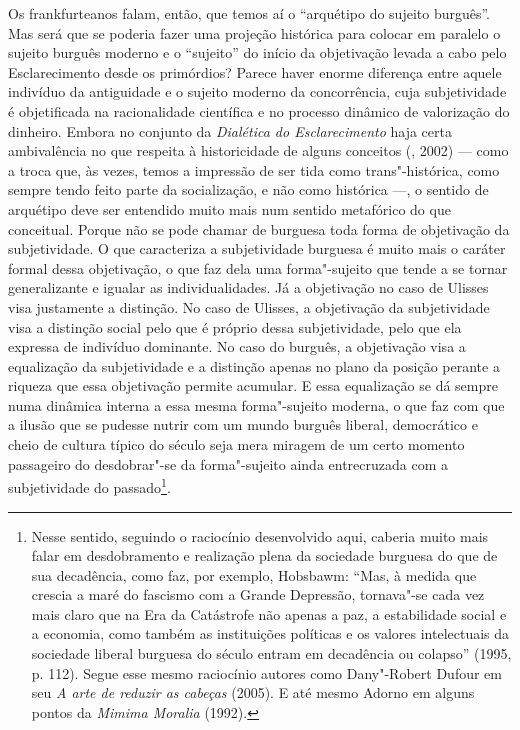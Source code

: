 Os frankfurteanos falam, então, que temos aí o ``arquétipo do sujeito
burguês''. Mas será que se poderia fazer uma projeção histórica para
colocar em paralelo o sujeito burguês moderno e o ``sujeito'' do início
da objetivação levada a cabo pelo Esclarecimento desde os primórdios?
Parece haver enorme diferença entre aquele indivíduo da antiguidade e o
sujeito moderno da concorrência, cuja subjetividade é objetificada na
racionalidade científica e no processo dinâmico de valorização do
dinheiro. Embora no conjunto da \emph{Dialética do Esclarecimento} haja
certa ambivalência no que respeita à historicidade de alguns conceitos
(, 2002) --- como a troca que, às vezes, temos a impressão de ser
tida como trans"-histórica, como sempre tendo feito parte da
socialização, e não como histórica ---, o sentido de arquétipo deve ser
entendido muito mais num sentido metafórico do que conceitual. Porque
não se pode chamar de burguesa toda forma de objetivação da
subjetividade. O que caracteriza a subjetividade burguesa é muito mais o
caráter formal dessa objetivação, o que faz dela uma forma"-sujeito que
tende a se tornar generalizante e igualar as individualidades. Já a
objetivação no caso de Ulisses visa justamente a distinção. No
caso de Ulisses, a objetivação da subjetividade visa a distinção social
pelo que é próprio dessa subjetividade, pelo que ela expressa de
indivíduo dominante. No caso do burguês, a objetivação visa a
equalização da subjetividade e a distinção apenas no plano da posição
perante a riqueza que essa objetivação permite acumular. E essa
equalização se dá sempre numa dinâmica interna a essa mesma
forma"-sujeito moderna, o que faz com que a ilusão que se pudesse nutrir
com um mundo burguês liberal, democrático e cheio de cultura típico do
século  seja mera miragem de um certo momento passageiro do
desdobrar"-se da forma"-sujeito ainda entrecruzada com a subjetividade do
passado\footnote{Nesse sentido, seguindo o raciocínio desenvolvido aqui,
  caberia muito mais falar em desdobramento e realização plena da
  sociedade burguesa do que de sua decadência, como faz, por exemplo,
  Hobsbawm: ``Mas, à medida que crescia a maré do fascismo com a Grande
  Depressão, tornava"-se cada vez mais claro que na Era da Catástrofe
  não apenas a paz, a estabilidade social e a economia, como também as
  instituições políticas e os valores intelectuais da sociedade liberal
  burguesa do século  entram em decadência ou colapso'' (1995, p.
  112). Segue esse mesmo raciocínio autores como Dany"-Robert Dufour em
  seu \emph{A arte de reduzir as cabeças} (2005). E até mesmo
  Adorno em alguns pontos da \emph{Mimima Moralia} (1992).}.

